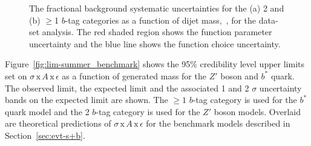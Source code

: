 \begin{figure}[!ht]
  \begin{center}
    \captionsetup[subfigure]{aboveskip=0pt,justification=centering}
  \end{center}
  \vspace{-1em}
  \caption[The background systematic uncertainties as a function of dijet mass
    in the \summer{} data-set analysis.]
          {The fractional background systematic uncertainties for the (a) 2 and (b) $\geq$1 $b$-tag categories
            as a function of dijet mass,~\mjj, for the \summer{} data-set analysis.
            The red shaded region shows the function parameter uncertainty and
            the blue line shows the function choice uncertainty.  }
          \label{fig:lim-summer_systBkg}
\end{figure}

Figure~\ref{fig:lim-summer_benchmark} shows the
95\% credibility level upper limits set on $\sigma\,\text{x}\,\mathit{A}\,\text{x}\,\epsilon$
as a function of generated mass
for the $Z'$ boson and $b^*$ quark.
The observed limit, the expected limit and the associated 1 and 2 $\sigma$ uncertainty bands on the expected limit are shown.
The $\geq1$ $b$-tag category is used for the $b^*$ quark model
and the 2 $b$-tag category is used for the $Z'$ boson models.
Overlaid are theoretical predictions of
$\sigma\,\text{x}\,\mathit{A}\,\text{x}\,\epsilon$ for the benchmark models described in Section~\ref{sec:evt-s+b}.

